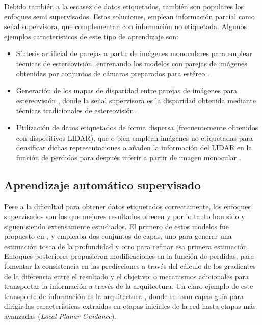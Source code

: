 Debido también a la escasez de datos etiquetados, también son populares los enfoques semi supervisados. Estas soluciones, emplean información parcial como señal supervisora, que complementan con información no etiquetada. Algunos ejemplos característicos de este tipo de aprendizaje son: 
\begin{itemize}
    \item Síntesis artificial de parejas a partir de imágenes monoculares para emplear técnicas de estereovisión, entrenando los modelos con parejas de imágenes obtenidas por conjuntos de cámaras preparados para estéreo \cite{monocularstereosynthesis, single-view-stereo-matching}.
    \item Generación de los mapas de disparidad entre parejas de imágenes para estereovisión \cite{importancestereo, deep3d}, donde la señal supervisora es la disparidad obtenida mediante técnicas tradicionales de estereovisión.
    \item Utilización de datos etiquetados de forma dispersa (frecuentemente obtenidos con dispositivos LIDAR), que o bien emplean imágenes no etiquetadas para densificar dichas representaciones \cite{lidarcompletion, sparse-to-dense, hu2020PENet} o añaden la información del LIDAR en la función de perdidas para después inferir a partir de imagen monocular \cite{lidarlossfunction}.
\end{itemize}

\subsection{Aprendizaje automático supervisado}\label{aprendizaje-supervisado}
Pese a la dificultad para obtener datos etiquetados correctamente, los enfoques supervisados son los que mejores resultados ofrecen y por lo tanto han sido y siguen siendo extensamente estudiados. El primero de estos modelos fue propuesto en \cite{eigen-multi-scale}, y empleaba dos conjuntos de capas, uno para generar una estimación tosca de la profundidad y otro para refinar esa primera estimación. Enfoques posteriores propusieron modificaciones en la función de perdidas, para fomentar la consistencia en las predicciones \cite{surfacenormals} a través del cálculo de los gradientes de la diferencia entre el resultado y el objetivo; o mecanismos adicionales para transportar la información a través de la arquitectura. Un claro ejemplo de este transporte de información es la arquitectura  \cite{bts}, donde se usan capas guía para dirigir las características extraidas en etapas iniciales de la red hasta etapas más avanzadas (\textit{Local Planar Guidance}).

